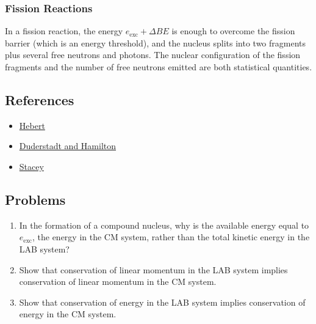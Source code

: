 \documentclass[11pt]{article}
\begin{document}
\subsubsection{Fission Reactions}
\label{sec:orgheadline8}
In a fission reaction, the energy \(e_{\text{exc}} + \Delta BE\) is enough to overcome the fission barrier (which is an energy threshold), and the nucleus splits into two fragments plus several free neutrons and photons.  The nuclear configuration of the fission fragments and the number of free neutrons emitted are both statistical quantities.  
\subsection{References}
\label{sec:orgheadline10}
\begin{itemize}
\item \href{Hebert2009}{Hebert}
\item \href{Duderstadt:Hamilton1976}{Duderstadt and Hamilton}
\item \href{Stacey2001}{Stacey}
\end{itemize}
\subsection{Problems}
\label{sec:orgheadline11}
\begin{enumerate}
\item In the formation of a compound nucleus, why is the available energy equal to \(e_\text{exc}\), the energy in the CM system, rather than the total kinetic energy in the LAB system?
\item Show that conservation of linear momentum in the LAB system implies conservation of linear momentum in the CM system.
\item Show that conservation of energy in the LAB system implies conservation of energy in the CM system.
\end{enumerate}
\end{document}
